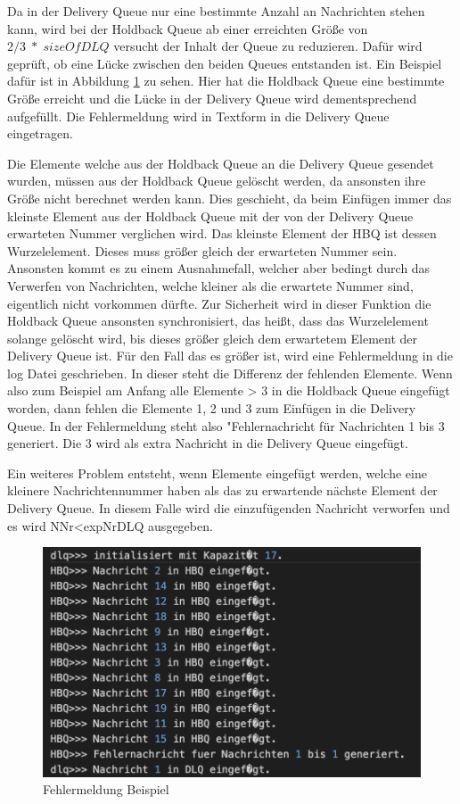 Da in der Delivery Queue nur eine bestimmte Anzahl an Nachrichten stehen kann, wird bei der Holdback Queue ab einer erreichten Größe von $2/3\;*\;sizeOfDLQ$ versucht der Inhalt der Queue zu reduzieren. Dafür wird geprüft, ob eine Lücke zwischen den beiden Queues entstanden ist. Ein Beispiel dafür ist in Abbildung \ref{fig:BeispielHBQFehler} zu sehen. Hier hat die Holdback Queue eine bestimmte Größe erreicht und die Lücke in der Delivery Queue wird dementsprechend aufgefüllt. Die Fehlermeldung wird in Textform in die Delivery Queue eingetragen.

Die Elemente welche aus der Holdback Queue an die Delivery Queue gesendet wurden, müssen aus der Holdback Queue gelöscht werden, da ansonsten ihre Größe nicht berechnet werden kann. 
Dies geschieht, da beim Einfügen immer das kleinste Element aus der Holdback Queue mit der von der Delivery Queue erwarteten Nummer verglichen wird. Das kleinste Element der HBQ ist dessen Wurzelelement. Dieses muss größer gleich der erwarteten Nummer sein. 
Ansonsten kommt es zu einem Ausnahmefall, welcher aber bedingt durch das Verwerfen von Nachrichten, welche kleiner als die erwartete Nummer sind, eigentlich nicht vorkommen dürfte. Zur Sicherheit wird in dieser Funktion die Holdback Queue ansonsten synchronisiert, das heißt, dass das Wurzelelement solange gelöscht wird, bis dieses größer gleich dem erwartetem Element der Delivery Queue ist. 
Für den Fall das es größer ist, wird eine Fehlermeldung in die log Datei geschrieben. In dieser steht die Differenz der fehlenden Elemente. Wenn also zum Beispiel am Anfang alle Elemente > 3 in die Holdback Queue eingefügt worden, dann fehlen die Elemente 1, 2 und 3 zum Einfügen in die Delivery Queue. In der Fehlermeldung steht also "Fehlernachricht für Nachrichten 1 bis 3 generiert. Die 3 wird als extra Nachricht in die Delivery Queue eingefügt.

Ein weiteres Problem entsteht, wenn Elemente eingefügt werden, welche eine kleinere Nachrichtennummer haben als das zu erwartende nächste Element der Delivery Queue. In diesem Falle wird die einzufügenden Nachricht verworfen und es wird NNr<expNrDLQ ausgegeben.

\begin{figure}[htbp]
\begin{center}
\includegraphics[scale=0.6]{Bilder/BeispielHBQFehler}
\caption{\label{fig:BeispielHBQFehler} Fehlermeldung Beispiel \cite{HBQfehler}} 
\end{center}
\end{figure}


